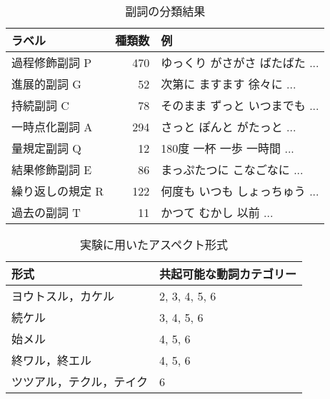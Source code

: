 \begin{table}[htb]
\caption{副詞の分類結果}
\label{tab:adverb1}
\centering
\begin{tabular}{|l|r|l|}  \hline
ラベル & 種類数 & 例 \\ \hline \hline
過程修飾副詞   {\sf P}    &   470  & ゆっくり がさがさ ばたばた  ... \\ \hline
進展的副詞     {\sf G}    &    52  & 次第に ますます 徐々に  ... \\ \hline
持続副詞       {\sf C}    &    78  & そのまま ずっと いつまでも ... \\ \hline
一時点化副詞   {\sf A}    &   294  & さっと ぽんと がたっと ... \\ \hline
量規定副詞     {\sf Q}    &    12  & 180度 一杯 一歩 一時間 ... \\ \hline
結果修飾副詞   {\sf E}    &    86  & まっぷたつに こなごなに ... \\ \hline 
繰り返しの規定 {\sf R}    &   122  & 何度も いつも しょっちゅう ... \\ \hline 
過去の副詞     {\sf T}    &    11  & かつて むかし 以前 ... \\ \hline
\end{tabular}
\end{table}
\vspace*{20mm}
\begin{table}[htb]
\caption{実験に用いたアスペクト形式}
\label{tab:form1}
\centering
\begin{tabular}{|l|l|}  \hline
形式                     & 共起可能な動詞カテゴリー \\ \hline\hline
ヨウトスル，カケル       & 2, 3, 4, 5, 6 \\ \hline
続ケル                   & 3, 4, 5, 6 \\ \hline
始メル                   & 4, 5, 6 \\ \hline
終ワル，終エル           & 4, 5, 6 \\ \hline
ツツアル，テクル，テイク & 6 \\ \hline
\end{tabular}
\end{table}

